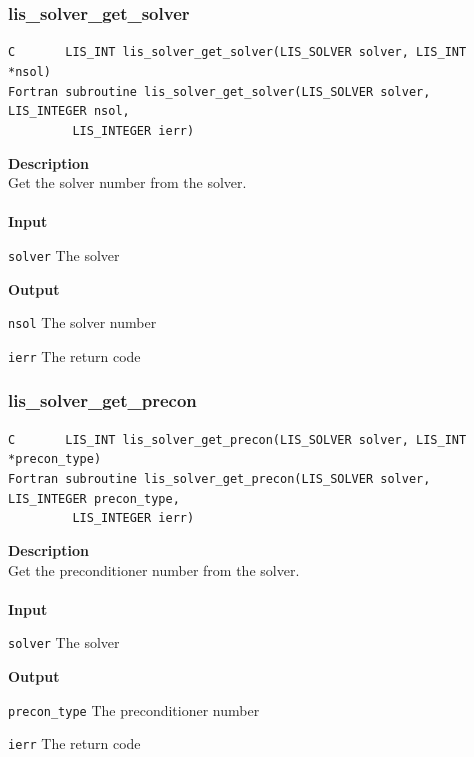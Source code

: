 \documentclass[a4paper]{article}
\newcommand{\namelistlabel}[1]{\mbox{#1}\hfill}
\newenvironment{namelist}[1]{%
\begin{list}{}
  {\let\makelabel\namelistlabel
  \settowidth{\labelwidth}{#1}
  \setlength{\leftmargin}{1.1\labelwidth}}
  }{%
\end{list}}
\begin{document}
\newpage
\subsubsection{lis\_solver\_get\_solver}
\begin{screen}
\verb|C       LIS_INT lis_solver_get_solver(LIS_SOLVER solver, LIS_INT *nsol)|\\
\verb|Fortran subroutine lis_solver_get_solver(LIS_SOLVER solver, LIS_INTEGER nsol,|\\
\verb|         LIS_INTEGER ierr)|
\end{screen}
{\bf Description}\\
\indent
Get the solver number from the solver.
\\ \\
\noindent
{\bf Input}
\begin{namelist}{XXXXXXXXXXXXXXXXXXXX}
\item[\tt solver] The solver
\end{namelist}
{\bf Output}
\begin{namelist}{XXXXXXXXXXXXXXXXXXXX}
\item[\tt nsol] The solver number
\item[\tt ierr] The return code
\end{namelist}

\subsubsection{lis\_solver\_get\_precon}
\begin{screen}
\verb|C       LIS_INT lis_solver_get_precon(LIS_SOLVER solver, LIS_INT *precon_type)|\\
\verb|Fortran subroutine lis_solver_get_precon(LIS_SOLVER solver, LIS_INTEGER precon_type,|\\
\verb|         LIS_INTEGER ierr)|
\end{screen}
{\bf Description}\\
\indent
Get the preconditioner number from the solver.
\\ \\
\noindent
{\bf Input}
\begin{namelist}{XXXXXXXXXXXXXXXXXXXX}
\item[\tt solver] The solver
\end{namelist}
{\bf Output}
\begin{namelist}{XXXXXXXXXXXXXXXXXXXX}
\item[\tt precon\_type] The preconditioner number
\item[\tt ierr] The return code
\end{namelist}
\end{document}
